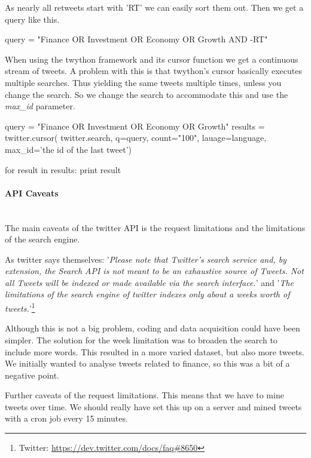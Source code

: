 As nearly all retweets start with 'RT' we can easily sort them out. Then we get
a query like this. 
\begin{python}
query = "Finance OR Investment OR Economy OR Growth AND -RT"
\end{python}

When using the twython framework and its cursor function we get a continuous
stream of tweets. A problem with this is that twython's cursor basically
executes multiple searches. Thus yielding the same tweets multiple times,
unless you change the search. So we change the search to accommodate this and
use the \textit{max\_id} parameter.
\begin{python}
query = "Finance OR Investment OR Economy OR Growth"
results = twitter.cursor(
                twitter.search,
                q=query,
                count="100",
                lauage=language,
                max_id='the id of the last tweet')

for result in results:
    print result
\end{python}
%

\paragraph{API Caveats}
\hspace{0pt}\\
The main caveats of the twitter API is the request limitations and the
limitations of the search engine. 

As twitter says themselves: 
'\textit{Please note that Twitter's search service and, by extension, the Search
API is not meant to be an exhaustive source of Tweets. Not all Tweets will be
indexed or made available via the search interface.}' and 
'\textit{The limitations of the search engine of twitter indexes only about a
weeks worth of tweets.}'\footnote{Twitter:
\url{https://dev.twitter.com/docs/faq#8650}}

Although this is not a big problem, coding and data acquisition could have been
simpler. The solution for the week limitation was to broaden the search to
include more words. This resulted in a more varied dataset, but also more
tweets. We initially wanted to analyse tweets related to finance, so this was a
bit of a negative point.  

Further caveats of the request limitations. This means that we have to mine
tweets over time. We should really have set this up on a server and mined
tweets with a cron job every 15 minutes.
%

